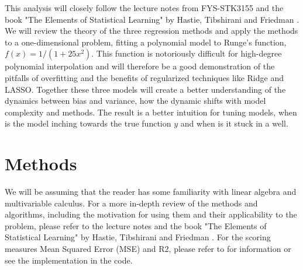 \documentclass[amssymb,twocolumn,aps]{revtex4}
\begin{document}
This analysis will closely follow the lecture notes from FYS-STK3155 \cite{compfys} and the book "The Elements of Statistical Learning" by Hastie, Tibshirani and Friedman \cite{hastie}.
We will review the theory of the three regression methods and apply the methods to a one-dimensional problem, fitting a polynomial model to Runge's function, $f(x)=1/(1+25x^2)$.
This function is notoriously difficult for high-degree polynomial interpolation and will therefore be a good demonstration of the pitfalls of overfitting and the benefits of regularized techniques like Ridge and LASSO.
Together these three models will create a better understanding of the dynamics between bias and variance, how the dynamic shifts with model complexity and methods.
The result is a better intuition for tuning models, when is the model inching towards the true function $y$ and when is it stuck in a well. 

\section{Methods}\label{section:methods}
We will be assuming that the reader has some familiarity with linear algebra and multivariable calculus.
For a more in-depth review of the methods and algorithms, including the motivation for using them and their applicability to the problem, please refer to the lecture notes \cite{compfys} and the book "The Elements of Statistical Learning" by Hastie, Tibshirani and Friedman \cite{hastie}.
For the scoring measures Mean Squared Error (MSE) and R2, please refer to \cite{scoring1,scoring2,scoring3} for information or see the implementation in the code.
\end{document}
